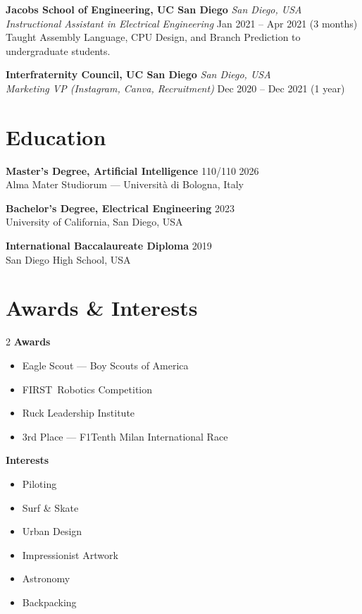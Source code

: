 \documentclass[11pt,a4paper]{article}
\begin{document}
\vspace{0.4em}
\newpage
\textbf{Jacobs School of Engineering, UC San Diego} \hfill \textit{San Diego, USA}\\
\textit{Instructional Assistant in Electrical Engineering} \hfill Jan 2021 -- Apr 2021 (3 months)\\
Taught Assembly Language, CPU Design, and Branch Prediction to undergraduate students.

\vspace{0.4em}
\textbf{Interfraternity Council, UC San Diego} \hfill \textit{San Diego, USA}\\
\textit{Marketing VP (Instagram, Canva, Recruitment)} \hfill Dec 2020 -- Dec 2021 (1 year)

\section{Education}

\textbf{Master's Degree, Artificial Intelligence} 110/110 \hfill 2026\\
Alma Mater Studiorum --- Università di Bologna, Italy

\vspace{0.3em}
\textbf{Bachelor's Degree, Electrical Engineering} \hfill 2023\\
University of California, San Diego, USA

\vspace{0.3em}
\textbf{International Baccalaureate Diploma} \hfill 2019\\
San Diego High School, USA

\section{Awards \& Interests}

\begin{multicols}{2}
\textbf{Awards}
\begin{itemize}
  \item Eagle Scout --- Boy Scouts of America
  \item FIRST\textregistered\ Robotics Competition
  \item Ruck Leadership Institute
  \item 3rd Place --- F1Tenth Milan International Race
\end{itemize}

\columnbreak
\textbf{Interests}
\begin{itemize}
  \item Piloting
  \item Surf \& Skate
  \item Urban Design
  \item Impressionist Artwork
  \item Astronomy
  \item Backpacking
\end{itemize}
\end{multicols}
\end{document}
